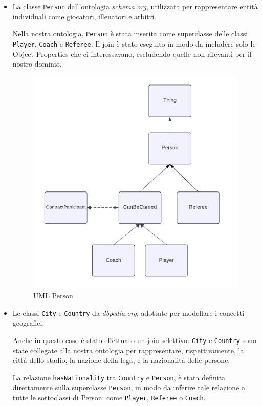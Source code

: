 \documentclass[11pt]{report} %
\begin{document}
\begin{itemize}
    \item La classe \texttt{Person} dall'ontologia \textit{schema.org}, utilizzata per rappresentare entità individuali come giocatori, illenatori e arbitri. 
    
    Nella nostra ontologia, \texttt{Person} è stata inserita come superclasse delle classi \texttt{Player}, \texttt{Coach} e \texttt{Referee}. Il join è stato eseguito in modo da includere solo le Object Properties che ci interessavano, escludendo quelle non rilevanti per il nostro dominio.

    \begin{figure}[H]
        \centering
        \includegraphics[width=0.8\linewidth]{PERSON.png}
        \caption{UML Person}
    \end{figure}
    \newpage
    \item Le classi \texttt{City} e \texttt{Country} da \textit{dbpedia.org}, adottate per modellare i concetti geografici. 
  
    Anche in questo caso è stato effettuato un join selettivo: \texttt{City} e \texttt{Country} sono state collegate alla nostra ontologia per rappresentare, rispettivamente, la città dello stadio, la nazione della lega, e la nazionalità delle persone.
    
    La relazione \texttt{hasNationality} tra \texttt{Country} e \texttt{Person}, è stata definita direttamente sulla superclasse \texttt{Person}, in modo da inferire tale relazione a tutte le sottoclassi di Person: come \texttt{Player}, \texttt{Referee} o \texttt{Coach}.
\end{itemize}
\end{document}
